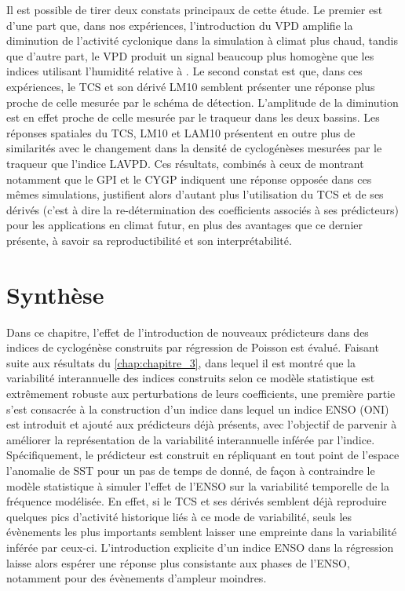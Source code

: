 \documentclass[../main.tex]{subfiles}
\begin{document}
Il est possible de tirer deux constats principaux de cette étude. Le premier est d'une part que, dans nos expériences, l'introduction du VPD amplifie la
diminution de l'activité cyclonique dans la simulation à climat plus chaud, tandis que d'autre part, le VPD produit un signal beaucoup plus homogène que les
indices utilisant l'humidité relative à . Le second constat est que, dans ces expériences, le TCS et son dérivé LM10 semblent présenter une réponse
plus proche de celle mesurée par le schéma de détection. L'amplitude de la diminution est en effet proche de celle mesurée par le traqueur dans les deux
bassins. Les réponses spatiales du TCS, LM10 et LAM10 présentent en outre plus de similarités avec le changement dans la densité de cyclogénèses mesurées par le
traqueur que l'indice LAVPD. Ces résultats, combinés à ceux de \textcite{cattiaux_projected_2020,chauvin_future_2020} montrant notamment que le GPI et le CYGP
indiquent une réponse opposée dans ces mêmes simulations, justifient alors d'autant plus l'utilisation du TCS et de ses dérivés (c'est à dire la re-détermination
des coefficients associés à ses prédicteurs) pour les applications en climat futur, en plus des avantages que ce dernier présente, à savoir sa reproductibilité
et son interprétabilité.

\section{Synthèse}

Dans ce chapitre, l'effet de l'introduction de nouveaux prédicteurs dans des indices de cyclogénèse construits par régression de Poisson est évalué. Faisant
suite aux résultats du \cref{chap:chapitre_3}, dans lequel il est montré que la variabilité interannuelle des indices construits selon ce modèle statistique est
extrêmement robuste aux perturbations de leurs coefficients, une première partie s'est consacrée à la construction d'un indice dans lequel un indice ENSO (ONI)
est introduit et ajouté aux prédicteurs déjà présents, avec l'objectif de parvenir à améliorer la représentation de la variabilité interannuelle inférée par
l'indice. Spécifiquement, le prédicteur est construit en répliquant en tout point de l'espace l'anomalie de SST pour un pas de temps de donné, de façon à
contraindre le modèle statistique à simuler l'effet de l'ENSO sur la variabilité temporelle de la fréquence modélisée. En effet, si le TCS et ses dérivés
semblent déjà reproduire quelques pics d'activité historique liés à ce mode de variabilité, seuls les évènements les plus importants semblent laisser une
empreinte dans la variabilité inférée par ceux-ci. L'introduction explicite d'un indice ENSO dans la régression laisse alors espérer une réponse plus
consistante aux phases de l'ENSO, notamment pour des évènements d'ampleur moindres.
\end{document}

